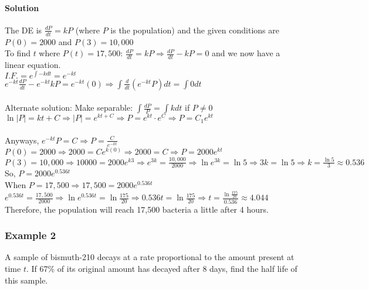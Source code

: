 \documentclass{article}
\begin{document}
\paragraph{Solution} The DE is $\frac{dP}{dt}=kP$ (where $P$ is the population) and the given conditions are $P(0)=2000$ and $P(3)=10,000$
\\To find $t$ where $P(t)=17,500$: $\frac{dP}{dt}=kP\Rightarrow\frac{dP}{dt}-kP=0$ and we now have a linear equation.
\\$I.F.=e^{\int -kdt}=e^{-kt}$
\\$e^{-kt}\frac{dP}{dt}-e^{-kt}kP=e^{-kt}(0)\Rightarrow\int\frac{d}{dt}(e^{-kt}P)dt=\int0dt$
\\\\Alternate solution: Make separable: $\int\frac{dP}{P}=\int kdt$ if $P\neq0$
\\$\ln|P|=kt+C\Rightarrow|P|=e^{kt+C}\Rightarrow P=e^{kt}\cdot e^C\Rightarrow P=C_1e^{kt}$
\\\\Anyways, $e^{-kt}P=C\Rightarrow P=\frac{C}{e^{-kt}}$
\\$P(0)=2000\Rightarrow2000=Ce^{k(0)}\Rightarrow2000=C\Rightarrow P=2000e^{kt}$
\\$P(3)=10,000\Rightarrow10000=2000e^{k{3}}\Rightarrow e^{3k}=\frac{10,000}{2000}\Rightarrow\ln{e^{3k}}=\ln5\Rightarrow3k=\ln5\Rightarrow k=\frac{\ln5}{3}\approx0.536$
\\So, $P=2000e^{0.536t}$
\\When $P=17,500\Rightarrow17,500=2000e^{0.536t}$
\\$e^{0.536t}=\frac{17,500}{2000}\Rightarrow\ln{e^{0.536t}}=\ln\frac{175}{20}\Rightarrow0.536t=\ln\frac{175}{20}\Rightarrow t=\frac{\ln\frac{175}{20}}{0.536}\approx4.044$
\\Therefore, the population will reach 17,500 bacteria a little after 4 hours.

\subsubsection{Example 2}
A sample of bismuth-210 decays at a rate proportional to the amount present at time $t$.
If 67\% of its original amount has decayed after 8 days, find the half life of this sample.
\end{document}
